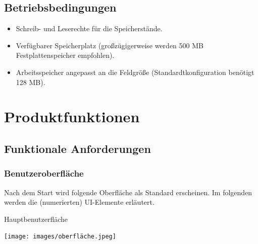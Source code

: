 \documentclass[11pt,a4paper]{article}
\begin{document}
\subsection{Betriebsbedingungen}


\begin{itemize}
    \item Schreib- und Leserechte für die Speicherstände.
    \item Verfügbarer Speicherplatz (großzügigerweise werden 500 MB Festplattenspeicher empfohlen).
    \item Arbeitsspeicher angepasst an die Feldgröße (Standardtkonfiguration benötigt 128 MB).
\end{itemize}

\pagebreak



\section{Produktfunktionen}
\subsection{Funktionale Anforderungen}
\subsubsection{Benutzeroberfläche}
Nach dem Start wird folgende Oberfläche als Standard erscheinen. Im folgenden werden die (numerierten) UI-Elemente erläutert.
\par
Hauptbenutzerfläche
\par
\texttt{[image: images/oberfläche.jpeg]}
\end{document}
